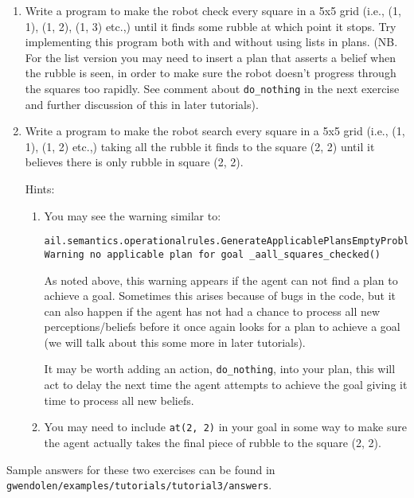 \begin{enumerate}
\item Write a program to make the robot check every square in a 5x5
  grid (i.e., (1, 1), (1, 2), (1, 3) etc.,) until it finds some rubble
  at which point it stops.  Try implementing this program both with
  and without using lists in plans.  (NB.  For the list version you
  may need to insert a plan that asserts a belief when the rubble is
  seen, in order to make sure the robot doesn't progress through the
  squares too rapidly.  See comment about \lstinline{do_nothing} in
  the next exercise and further discussion of this in later
  tutorials). 
\item Write a program to make the robot search every square in a 5x5
  grid (i.e., (1, 1), (1, 2) etc.,) taking all the rubble it finds to
  the square (2, 2) until it believes there is only rubble in square
  (2, 2). 

Hints:
\begin{enumerate}
\item You may see the warning similar to:
\begin{small}
\begin{verbatim}
ail.semantics.operationalrules.GenerateApplicablePlansEmptyProblemGoal[WARNING|main|2:09:29]: 
Warning no applicable plan for goal _aall_squares_checked() 
\end{verbatim}
\end{small}
As noted above, this warning appears if the agent can not find a plan
to achieve a goal.
Sometimes this arises because of bugs in the code, but it can also
happen if the agent has not had a chance to process all new
perceptions/beliefs before it once again looks for a plan to achieve a
goal (we will talk about this some more in later tutorials).   

It may be worth adding an action,
\lstinline{do_nothing}, into your plan, this
will act to delay the next time the agent attempts to achieve the goal
giving it time to process all new beliefs. 
\item You may need to include \lstinline{at(2, 2)} in your goal in
  some way to make sure the agent actually takes the final piece of
  rubble to the square (2, 2). 
\end{enumerate}
\end{enumerate}
\begin{sloppypar}
Sample answers for these two exercises can be found in \texttt{gwendolen/examples/tutorials/tutorial3/answers}.
\end{sloppypar}
